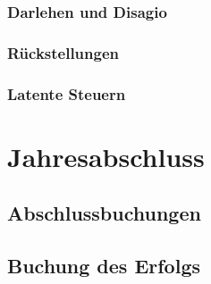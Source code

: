 \documentclass[paper=a4, fontsize=11pt]{scrartcl}
\numberwithin{equation}{section}
\numberwithin{figure}{section}
\numberwithin{table}{section}
\begin{document}

\subsubsection{Darlehen und Disagio}


\subsubsection{Rückstellungen}


\subsubsection{Latente Steuern}


\newpage

\section{Jahresabschluss}


\subsection{Abschlussbuchungen}


\subsection{Buchung des Erfolgs}

\end{document}
